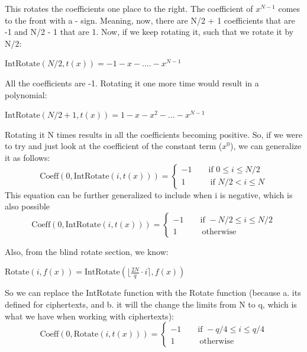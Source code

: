 \documentclass{report}
\begin{document}
This rotates the coefficients one place to the right. The coefficient of $x^{N-1}$ comes to the front with a - sign. Meaning, now, there are N/2 + 1 coefficients that are -1 and N/2 - 1 that are 1. Now, if we keep rotating it, such that we rotate it by N/2:
\begin{center}
	$\text{IntRotate}(N/2, t(x)) = -1 - x -....- x^{N-1}$
\end{center}
All the coefficients are -1. Rotating it one more time would result in a polynomial:
\begin{center}
	$\text{IntRotate}(N/2 + 1, t(x)) = 1 - x - x^2 - ...- x^{N-1}$
\end{center}
Rotating it N times results in all the coefficients becoming positive. So, if we were to try and just look at the coefficient of the constant term ($x^0$), we can generalize it as follows:
\begin{equation}
	\text{Coeff}(0, \text{IntRotate}(i, t(x))) = 
	\begin{cases}
		-1 \qquad \text{if } 0 \leq i \leq N/2 \\
		 1 \qquad \quad \text{if } N/2 < i \leq N
	\end{cases}
\end{equation}
This equation can be further generalized to include  when i is negative, which is also possible
\begin{equation}
	\text{Coeff}(0, \text{IntRotate}(i, t(x))) = 
	\begin{cases}
		-1 \qquad \text{if } -N/2 \leq i \leq N/2 \\
		1 \qquad \quad \text{otherwise}
	\end{cases}
\end{equation}

Also, from the blind rotate section, we know:
\begin{center}
	$\text{Rotate}(i, f(x)) = \text{IntRotate}(\lfloor \frac{2N}{q} \cdot i \rceil, f(x))$
\end{center}

So we can replace the IntRotate function with the Rotate function (because a. its defined for ciphertexts, and b. it will the change the limits from N to q, which is what we have when working with ciphertexts):
\begin{equation}
	\text{Coeff}(0, \text{Rotate}(i, t(x))) = 
	\begin{cases}
		-1 \qquad \text{if } -q/4 \leq i \leq q/4 \\
		1 \qquad \quad \text{otherwise}
	\end{cases}
\end{equation}
\end{document}
